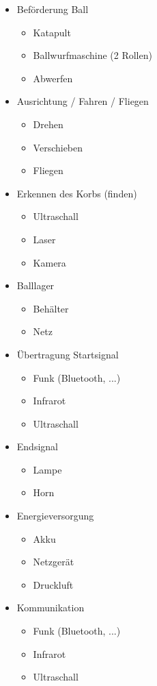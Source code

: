 \documentclass[a4paper,10pt,fleqn]{article}
\begin{document}
\begin{itemize}
    \item Beförderung Ball
    \begin{itemize}
        \item Katapult
        \item Ballwurfmaschine (2 Rollen)
        \item Abwerfen
    \end{itemize}
    \item Ausrichtung / Fahren / Fliegen
    \begin{itemize}
        \item Drehen
        \item Verschieben
        \item Fliegen
    \end{itemize}
    \item Erkennen des Korbs (finden)
    \begin{itemize}
        \item Ultraschall
        \item Laser
        \item Kamera
    \end{itemize}
    \item Balllager
    \begin{itemize}
        \item Behälter
        \item Netz
    \end{itemize}
    \item Übertragung Startsignal
    \begin{itemize}
        \item Funk (Bluetooth, ...)
        \item Infrarot
        \item Ultraschall
    \end{itemize}
    \item Endsignal
    \begin{itemize}
        \item Lampe
        \item Horn
    \end{itemize}
    \item Energieversorgung
    \begin{itemize}
        \item Akku
        \item Netzgerät
        \item Druckluft
    \end{itemize}
    \item Kommunikation
    \begin{itemize}
        \item Funk (Bluetooth, ...)
        \item Infrarot
        \item Ultraschall
    \end{itemize}
\end{itemize}
\end{document}
